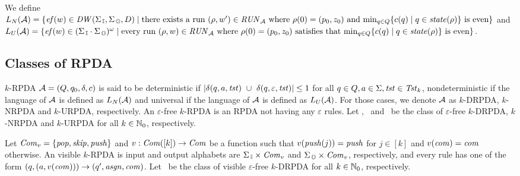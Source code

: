 We define $L_N({\cal A})=\{\mathit{ef}(w)\in \mathit{DW}(\Sigma_{\, \mathbb{I}},\Sigma_{\, \mathbb{O}},D) \mid \text{there exists a run }\allowbreak (\rho, w')\in\mathit{RUN}_{\cal A}\text{ where }\rho(0)=(p_0, z_0)\text{ and }{\rm min}_{q\in Q}\{c(q)\mid q\in\mathit{state}(\rho)\}\text{ is even}\}$ and
$L_U({\cal A})=\{\mathit{ef}(w)\in (\Sigma_{\, \mathbb{I}} \cdot \Sigma_{\, \mathbb{O}})^\omega \mid \text{every run }\allowbreak (\rho, w)\in\mathit{RUN}_{\cal A}\text{ where }\rho(0)=(p_0, z_0)\text{ satisfies that }{\rm min}_{q\in Q}\{c(q)\mid q\in\mathit{state}(\rho)\}\text{ is even}\}$.

\subsection{Classes of RPDA}
$k$-RPDA ${\cal A}=(Q, q_0, \delta, c)$ is said to be deterministic if
$|\delta(q,a,\tst)\ \cup\ \delta(q,\varepsilon,\tst)| \leq 1$ for all $q\in Q, a\in\Sigma, \mathit{tst}\in\mathit{Tst}_k$,
nondeterministic if the language of ${\cal A}$ is defined as $L_N({\cal A})$ and
universal if the language of ${\cal A}$ is defined as $L_U({\cal A})$.
For those cases, we denote ${\cal A}$ as $k$-DRPDA, $k$-NRPDA and $k$-URPDA, respectively.
An $\varepsilon$-free $k$-RPDA is an RPDA not having any $\varepsilon$ rules.
Let \DRPDA, \NRPDA\ and \URPDA\ be the class of $\varepsilon$-free $k$-DRPDA, $k$-NRPDA and $k$-URPDA for all $k\in\mathbb{N}_0$, respectively.

Let $\mathit{Com}_v=\{\mathit{pop},\mathit{skip},\mathit{push}\}$ and $v:\mathit{Com}([k])\to\mathit{Com}$ be a function such that $v(\mathit{push}(j))=\mathit{push}$ for $j\in[k]$ and $v(\mathit{com})=\mathit{com}$ otherwise.
An visible $k$-RPDA is input and output alphabets are $\Sigma_{\, \mathbb{I}}\times\mathit{Com}_v$ and $\Sigma_{\, \mathbb{O}}\times\mathit{Com}_v$, respectively,
and every rule has one of the form $(q,(a,v(\mathit{com})))\to(q',\mathit{asgn},\mathit{com})$.
Let \DRPDAv\ be the class of visible $\varepsilon$-free $k$-DRPDA for all $k\in\mathbb{N}_0$, respectively.
